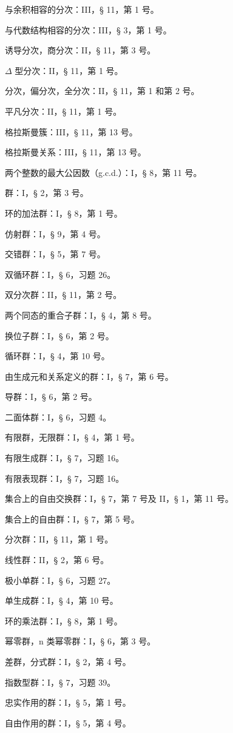 与余积相容的分次：III，§ 11，第 1 号。

与代数结构相容的分次：III，§ 3，第 1 号。

诱导分次，商分次：II，§ 11，第 3 号。

\(\Delta\) 型分次：II，§ 11，第 1 号。

分次，偏分次，全分次：II，§ 11，第 1 和第 2 号。

平凡分次：II，§ 11，第 1 号。

格拉斯曼簇：III，§ 11，第 13 号。

格拉斯曼关系：III，§ 11，第 13 号。

两个整数的最大公因数（g.c.d.）：I，§ 8，第 11 号。

群：I，§ 2，第 3 号。

环的加法群：I，§ 8，第 1 号。

仿射群：I，§ 9，第 4 号。

交错群：I，§ 5，第 7 号。

双循环群：I，§ 6，习题 26。

双分次群：II，§ 11，第 2 号。

两个同态的重合子群：I，§ 4，第 8 号。

换位子群：I，§ 6，第 2 号。

循环群：I，§ 4，第 10 号。

由生成元和关系定义的群：I，§ 7，第 6 号。

导群：I，§ 6，第 2 号。

二面体群：I，§ 6，习题 4。

有限群，无限群：I，§ 4，第 1 号。

有限生成群：I，§ 7，习题 16。

有限表现群：I，§ 7，习题 16。

集合上的自由交换群：I，§ 7，第 7 号及 II，§ 1，第 11 号。

集合上的自由群：I，§ 7，第 5 号。

分次群：II，§ 11，第 1 号。

线性群：II，§ 2，第 6 号。

极小单群：I，§ 6，习题 27。

单生成群：I，§ 4，第 10 号。

环的乘法群：I，§ 8，第 1 号。

幂零群，n 类幂零群：I，§ 6，第 3 号。

差群，分式群：I，§ 2，第 4 号。

指数型群：I，§ 7，习题 39。

忠实作用的群：I，§ 5，第 1 号。

自由作用的群：I，§ 5，第 4 号。

